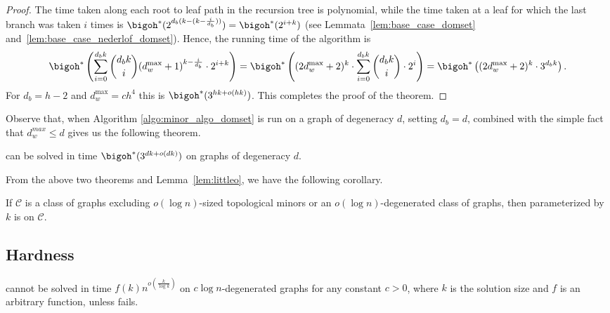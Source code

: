 \begin{proof}
The time taken along each root to leaf path in the recursion tree is polynomial, while the time taken at a leaf  for which the last branch was taken $i$ times is $\bigoh^*(2^{d_b (k - (k-{\frac i {d_b}}))})=\bigoh^*(2^{i+k})$ 
(see Lemmata~\ref{lem:base_case_domset} and~\ref{lem:base_case_nederlof_domset}). 
Hence, the running time of the algorithm is 
\[
\bigoh^* \left(\sum_{i=0}^{d_bk} \binom{d_bk}{i} (d_w^{\max}+1)^{k-{\frac i {d_b}}}\cdot 2^{i+k} \right)
=\bigoh^*\left((2d_w^{\max}+2)^k \cdot \sum_{i=0}^{d_bk} \binom{d_bk}{i} \cdot 2^i \right) =\bigoh^*\left((2d_w^{\max}+2)^k \cdot 3^{d_b k} \right).
\]
For $d_b= h-2$ and $d_w^{\max} =ch^4$
this is $\bigoh^*(3^{hk + o(hk)})$. This completes the proof of the theorem.

\end{proof}








\noindent
Observe that, when Algorithm \ref{algo:minor_algo_domset} is run on a graph of degeneracy $d$, setting $d_b=d$, combined with the simple fact that $d_w^{max}\leq d$ gives us the following theorem.

\begin{theorem}\label{}
 {\ds} can be solved in time $\bigoh^*(3^{dk+o(dk)})$ on graphs of degeneracy $d$.
\end{theorem}

\noindent
From the above two theorems and Lemma~\ref{lem:littleo}, we have the following corollary.

\begin{corollary}
If $\mathcal{C}$ is a class of graphs excluding $o(\log n)$-sized topological minors or an $o(\log n)$-degenerated class of graphs, then {\ds} parameterized by $k$ is {\FPT} on $\mathcal{C}$. 
\end{corollary}

\subsection{Hardness}

\begin{theorem}\label{thm:ds hardness logn}
{\ds} cannot be solved in time $f(k)n^{o({\frac {k} {\log k}})}$ on $c\log n$-degenerated graphs for any constant $c>0$, where $k$ is the solution size and $f$ is an arbitrary function, unless {\ETH} fails.
\end{theorem}

